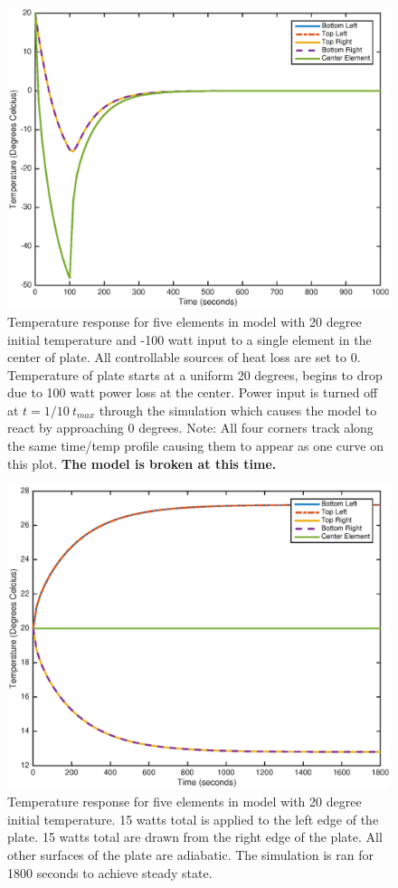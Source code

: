 \documentclass[10pt,twocolumn]{article}
\begin{document}
\begin{figure}
	\center
	\includegraphics[width=0.8\linewidth]{TempResponse,it20,pi-100.eps}
	\caption{Temperature response for five elements in model with 20 degree initial temperature and -100 watt input to a single element in the center of plate. All controllable sources of heat loss are set to 0. Temperature of plate starts at a uniform 20 degrees, begins to drop due to 100 watt power loss at the center. Power input is turned off at $t=1/10\ t_{max}$ through the simulation which causes the model to react by approaching 0 degrees. Note: All four corners track along the same time/temp profile causing them to appear as one curve on this plot. \textbf{The model is broken at this time.}}
	\label{fig:TempResponse,it20,pi-100}
\end{figure}

\begin{figure}
	\center
	\includegraphics[width=0.8\linewidth]{TmpRspn25x25,15Wleftedge,-15Wrightedge.eps}
	\caption{Temperature response for five elements in model with 20 degree initial temperature. 15 watts total is applied to the left edge of the plate. 15 watts total are drawn from the right edge of the plate. All other surfaces of the plate are adiabatic. The simulation is ran for 1800 seconds to achieve steady state.}
	\label{fig:TmpRspn25x25,15Wleftedge,-15Wrightedge}
\end{figure}
\end{document}
